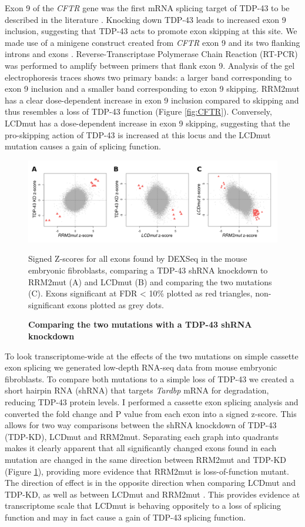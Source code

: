 Exon 9 of the \textit{CFTR} gene was the first mRNA splicing target of TDP-43 to be described in the literature \citep{Buratti2001-et}. Knocking down TDP-43 leads to increased exon 9 inclusion, suggesting that TDP-43 acts to promote exon skipping at this site. We made use of a minigene construct created from \textit{CFTR} exon 9 and its two flanking introns and exons \citep{Buratti2007minigene}.   Reverse-Transcriptase Polymerase Chain Reaction (RT-PCR) was performed to amplify between primers that flank exon 9. Analysis of the gel electrophoresis traces shows two primary bands: a larger band corresponding to exon 9 inclusion and a smaller band corresponding to exon 9 skipping. RRM2mut has a clear dose-dependent increase in exon 9 inclusion compared to skipping and thus resembles a loss of TDP-43 function (Figure  \ref{fig:CFTR}). Conversely, LCDmut has a dose-dependent increase in exon 9 skipping, suggesting that the pro-skipping action of TDP-43 is increased at this locus and the LCDmut mutation causes a gain of splicing function.


\begin{figure}[h!]
	\centering
	\includegraphics[width=14cm]{Figures/05_tdp_mice/mef_scatters.png}
	\caption{\textbf{Comparing the two mutations with a TDP-43 shRNA knockdown}}
	Signed Z-scores for all exons found by DEXSeq in the mouse embryonic fibroblasts, comparing a TDP-43 shRNA knockdown to RRM2mut (A) and LCDmut (B) and comparing the two mutations (C). Exons significant at FDR < 10\% plotted as red triangles, non-significant exons plotted as grey dots.
	\label{fig:mef_scatters}
\end{figure}

To look transcriptome-wide at the effects of the two mutations on simple cassette exon splicing we generated low-depth RNA-seq data from mouse embryonic fibroblasts. To compare both mutations to a simple loss of TDP-43 we created a short hairpin RNA (shRNA) that targets \textit{Tardbp} mRNA for degradation, reducing TDP-43 protein levels. I performed a cassette exon splicing analysis and converted the fold change and P value from each exon into a signed z-score. This allows for two way comparisons  between the shRNA knockdown of TDP-43 (TDP-KD), LCDmut and RRM2mut. Separating each graph into quadrants makes it clearly apparent that all significantly changed exons found in each mutation are changed in the same direction between RRM2mut and TDP-KD (Figure \ref{fig:mef_scatters}), providing more evidence that RRM2mut is loss-of-function mutant. The direction of effect is in the opposite direction when comparing LCDmut and TDP-KD, as well as between LCDmut and RRM2mut . This provides evidence at transcriptome scale that LCDmut is behaving oppositely to a loss of splicing function and may in fact cause a gain of TDP-43 splicing function.

